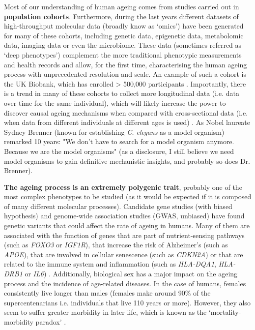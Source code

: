 \bigskip

Most of our understanding of human ageing comes from studies carried out in \textbf{population cohorts}. Furthermore, during the last years different datasets of high-throughput molecular data (broadly know as `omics') have been generated for many of these cohorts, including genetic data, epigenetic data, metabolomic data, imaging data or even the microbiome. These data (sometimes referred as `deep phenotypes') complement the more traditional phenotypic measurements and health records and allow, for the first time, characterising the human ageing process with unprecedented resolution and scale. An example of such a cohort is the UK Biobank, which has enrolled > 500,000 participants \cite{Bahcall2018}. Importantly, there is a trend in many of these cohorts to collect more longitudinal data (i.e. data over time for the same individual), which will likely increase the power to discover causal ageing mechanisms when compared with cross-sectional data (i.e. when data from different individuals at different ages is used) \cite{Rahmadi2017}. As Nobel laureate Sydney Brenner (known for establishing \textit{C. elegans} as a model organism) remarked 10 years: "We don't have to search for a model organism anymore. Because we are the model organisms" \cite{FitzGerald2018} (as a disclosure, I still believe we need model organisms to gain definitive mechanistic insights, and probably so does Dr. Brenner). 

\bigskip

\textbf{The ageing process is an extremely polygenic trait}, probably one of the most complex phenotypes to be studied (as it would be expected if it is composed of many different molecular processes). Candidate gene studies (with biased hypothesis) and genome-wide association studies (\acrshort{GWAS}, unbiased) have found genetic variants that could affect the rate of ageing in humans. Many of them are associated with the function of genes that are part of nutrient-sensing pathways (such as \textit{FOXO3} or \textit{IGF1R}), that increase the risk of Alzheimer's (such as \textit{APOE}), that are involved in cellular senescence (such as \textit{CDKN2A}) or that are related to the immune system and inflammation (such as \textit{HLA-DQA1}, \textit{HLA-DRB1} or \textit{IL6}) \cite{Singh2019,Partridge2018}. Additionally, biological sex has a major impact on the ageing process and the incidence of age-related diseases. In the case of humans, females consistently live longer than males (females make around 90\% of the supercentenarians i.e. individuals that live 110 years or more). However, they also seem to suffer greater morbidity in later life, which is known as the `mortality-morbidity paradox' \cite{Austad2016}.


